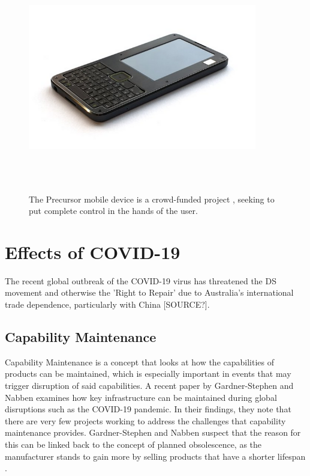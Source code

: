 \begin{figure} [h]
    \centering
    \includegraphics[width=10cm,height=10cm,keepaspectratio]{Figures/precursor.png}
    \caption{The Precursor mobile device is a crowd-funded project \cite{precursor}, seeking to put complete control in the hands of the user.}
    \label{fig:Precursor}
\end{figure}


\section{Effects of COVID-19}
The recent global outbreak of the COVID-19 virus has threatened the DS movement and otherwise the 'Right to Repair' due to Australia's international trade dependence, particularly with China [SOURCE?].

\subsection{Capability Maintenance} %

Capability Maintenance is a concept that looks at how the capabilities of products can be maintained, which is especially important in events that may trigger disruption of said capabilities.
A recent paper by Gardner-Stephen and Nabben \cite{capability} examines how key infrastructure can be maintained during global disruptions such as the COVID-19 pandemic.
In their findings, they note that there are very few projects working to address the challenges that capability maintenance provides.
Gardner-Stephen and Nabben suspect that the reason for this can be linked back to the concept of planned obsolescence, as the manufacturer stands to gain more by selling products that have a shorter lifespan \cite{obsolescence2}.

